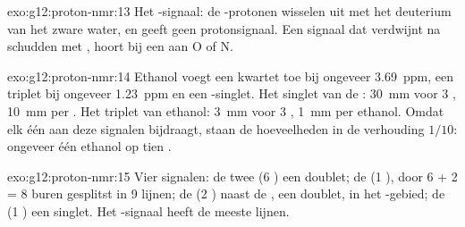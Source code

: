 \begin{solution}{exo:g12:proton-nmr:13}
Het -signaal: de -protonen wisselen uit met het deuterium
van het zware water, en  geeft geen protonsignaal. Een signaal
dat verdwijnt na schudden met , hoort bij een  aan O of N.
\end{solution}

\begin{solution}{exo:g12:proton-nmr:14}
Ethanol voegt een kwartet toe bij ongeveer \qty{3.69}{ppm}, een triplet
bij ongeveer \qty{1.23}{ppm} en een -singlet. Het singlet van de
: \qty{30}{mm} voor 3 , \qty{10}{mm} per  . Het
triplet van ethanol: \qty{3}{mm} voor 3 , \qty{1}{mm} per 
ethanol. Omdat elk  één  aan deze signalen bijdraagt,
staan de hoeveelheden in de verhouding $1/10$: ongeveer één 
ethanol op tien  .
\end{solution}

\begin{solution}{exo:g12:proton-nmr:15}
Vier signalen: de twee  (6 ) een doublet; de  (1
), door 6 + 2 = 8 buren gesplitst in 9 lijnen; de  (2
) naast de , een doublet, in het -gebied; de
 (1 ) een singlet. Het -signaal heeft de meeste
lijnen.
\end{solution}

